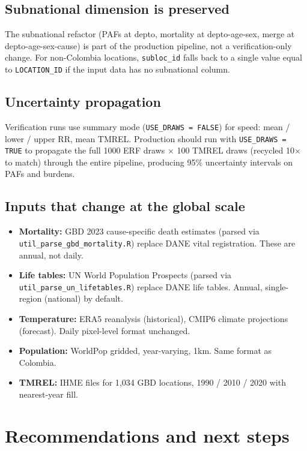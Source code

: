\documentclass[11pt]{article}
\begin{document}
\subsection{Subnational dimension is preserved}

The subnational refactor (PAFs at depto, mortality at depto-age-sex,
merge at depto-age-sex-cause) is part of the production pipeline, not a
verification-only change. For non-Colombia locations, \texttt{subloc\_id}
falls back to a single value equal to \texttt{LOCATION\_ID} if the input
data has no subnational column.

\subsection{Uncertainty propagation}

Verification runs use summary mode (\texttt{USE\_DRAWS = FALSE}) for speed:
mean / lower / upper RR, mean TMREL. Production should run with
\texttt{USE\_DRAWS = TRUE} to propagate the full 1000 ERF draws $\times$ 100
TMREL draws (recycled 10$\times$ to match) through the entire pipeline,
producing 95\% uncertainty intervals on PAFs and burdens.

\subsection{Inputs that change at the global scale}

\begin{itemize}[itemsep=2pt]
  \item \textbf{Mortality:} GBD 2023 cause-specific death estimates (parsed
    via \texttt{util\_parse\_gbd\_mortality.R}) replace DANE vital
    registration. These are annual, not daily.
  \item \textbf{Life tables:} UN World Population Prospects (parsed via
    \texttt{util\_parse\_un\_lifetables.R}) replace DANE life tables.
    Annual, single-region (national) by default.
  \item \textbf{Temperature:} ERA5 reanalysis (historical), CMIP6 climate
    projections (forecast). Daily pixel-level format unchanged.
  \item \textbf{Population:} WorldPop gridded, year-varying, 1km. Same
    format as Colombia.
  \item \textbf{TMREL:} IHME files for 1{,}034 GBD locations, 1990 / 2010
    / 2020 with nearest-year fill.
\end{itemize}

\section{Recommendations and next steps}
\end{document}
